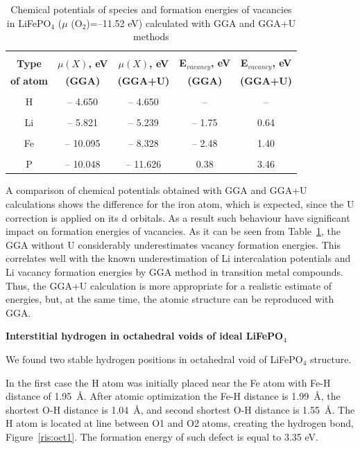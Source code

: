 \begin{table}[h]
\caption{Chemical potentials of species and formation energies of  vacancies in LiFePO$_4$ ($\mu$ (O$_2$)=--11.52 eV) calculated with GGA and GGA+U methods}
\label{tabular:form_en}
\begin{center}
\begin{tabular}{|c|c|c|c|c|}
\hline
& & & & \\
\textbf{Type} & \textbf{$\mu (X)$, eV} & \textbf{$\mu (X)$, eV} & \textbf{E$_{vacancy}$, eV} & \textbf{E$_{vacancy}$, eV} \\
\textbf{of atom} & \textbf{(GGA)} & \textbf{(GGA+U)} & \textbf{(GGA)} & \textbf{(GGA+U)} \\
\hline
&  & & & \\
H & -- 4.650 & -- 4.650 & -- & -- \\ 
\hline
&  & & & \\
Li & -- 5.821 & -- 5.239 & -- 1.75 & 0.64\\ 
\hline
& & & & \\
Fe & -- 10.095 & -- 8.328 & -- 2.48 & 1.40 \\ 
\hline
& & & & \\
P & -- 10.048 & -- 11.626 & 0.38 & 3.46 \\ 
\hline
\end{tabular}
\end{center}
\end{table}

A comparison of chemical potentials obtained with GGA and GGA+U calculations shows the difference for the iron atom, which is expected, since the U correction is applied on its d orbitals. As a result such behaviour have significant impact on formation energies of vacancies. As it can be seen from Table~\ref{tabular:form_en}, the GGA without U considerably underestimates vacancy formation energies. 
This correlates well with the known underestimation of Li intercalation potentials and Li vacancy formation energies by GGA method in transition metal compounds.
Thus, the GGA+U calculation is more appropriate for a realistic estimate of energies, but, at the same time, the atomic structure can be reproduced with GGA.

\textbf{Interstitial hydrogen in  octahedral voids of ideal LiFePO$_4$}

We found two stable hydrogen positions in octahedral void of LiFePO$_4$ structure. 

In the first case the H atom was initially placed near the Fe atom with Fe-H distance of 1.95~{\AA}. After atomic optimization the Fe-H distance is 1.99~{\AA}, the shortest O-H distance is 1.04{~\AA}, and second shortest O-H distance is 1.55{~\AA}. The H atom is located at line between O1 and O2 atoms, creating the hydrogen bond, Figure~\ref{ris:oct1}. The formation energy of such defect is equal to 3.35 eV.

